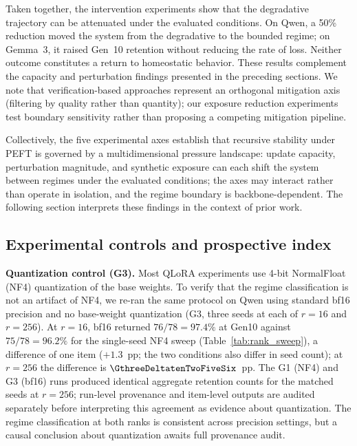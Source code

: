 \documentclass[a4paper,fleqn]{cas-dc}
\newif\ifshowchanges
\newcommand{\rev}[1]{\ifshowchanges{\color{blue}#1}\else{#1}\fi}
\begin{document}
Taken together, the intervention experiments show that the 
\rev{degradative trajectory can be attenuated under the evaluated 
conditions. On Qwen, a 50\% reduction moved the system from the degradative to the bounded regime; on Gemma~3, it raised Gen~10 retention without reducing the rate of loss. Neither outcome constitutes a return to homeostatic behavior.} These results complement the capacity and perturbation findings presented in the preceding sections. We note
that verification-based approaches \citep{yi2025} represent an orthogonal
mitigation axis (filtering by quality rather than quantity); our exposure
reduction experiments test boundary sensitivity rather than proposing a
competing mitigation pipeline.

Collectively, the five experimental axes establish that recursive stability
under PEFT is governed by a multidimensional pressure landscape: update
capacity, perturbation magnitude, and synthetic exposure \rev{can each shift} the system between regimes under the evaluated conditions; the axes may interact rather than operate in isolation, and the regime boundary is backbone-dependent. The following section
interprets these findings in the context of prior work.

\FloatBarrier
\subsection{Experimental controls and prospective index}\label{sec:res_controls}

\rev{\textbf{Quantization control (G3).}
Most QLoRA experiments use 4-bit NormalFloat (NF4) quantization of the base
weights. To verify that the regime classification is not an artifact of NF4, we
re-ran the same protocol on Qwen using standard bf16 precision and no base-weight
quantization (G3, three seeds at each of $r=16$ and $r=256$). At $r=16$, bf16 returned $76/78 = 97.4\%$ at Gen10 against $75/78 = 96.2\%$ for
the single-seed NF4 sweep (Table~\ref{tab:rank_sweep}), a difference of one item ($+1.3$~pp; the two conditions also differ in seed count); at $r=256$ the difference is $\GthreeDeltatenTwoFiveSix$~pp.
The G1 (NF4) and G3 (bf16) runs produced identical aggregate retention counts
for the matched seeds at $r=256$; run-level provenance and item-level outputs
are audited separately before interpreting this agreement as evidence about
quantization. The regime classification at both ranks is consistent across
precision settings, but a causal conclusion about quantization awaits full
provenance audit.}
\end{document}
